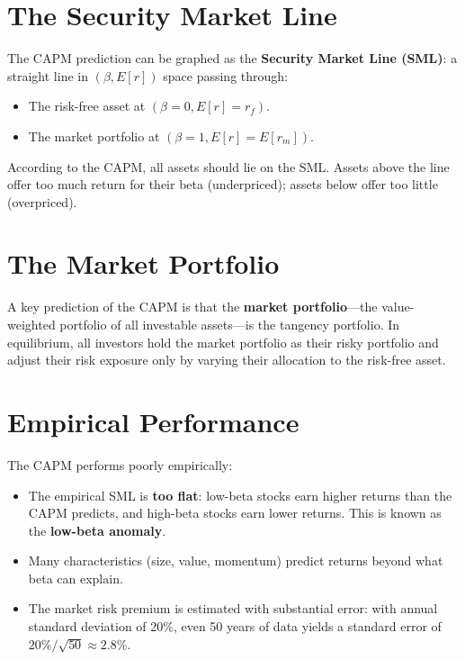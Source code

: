 \documentclass[11pt,letterpaper]{report}
\begin{document}
\section{The Security Market Line}


The CAPM prediction can be graphed as the \textbf{Security Market Line (SML)}: a straight line in $(\beta, E[r])$ space passing through:

\begin{itemize}
  \item The risk-free asset at $(\beta = 0, E[r] = r_f)$.
  \item The market portfolio at $(\beta = 1, E[r] = E[r_m])$.
\end{itemize}

According to the CAPM, all assets should lie on the SML.  Assets above the line offer too much return for their beta (underpriced); assets below offer too little (overpriced).

\section{The Market Portfolio}


A key prediction of the CAPM is that the \textbf{market portfolio}---the value-weighted portfolio of all investable assets---is the tangency portfolio.  In equilibrium, all investors hold the market portfolio as their risky portfolio and adjust their risk exposure only by varying their allocation to the risk-free asset.

\section{Empirical Performance}


The CAPM performs poorly empirically:

\begin{itemize}
  \item The empirical SML is \textbf{too flat}: low-beta stocks earn higher returns than the CAPM predicts, and high-beta stocks earn lower returns.  This is known as the \textbf{low-beta anomaly}.
  \item Many characteristics (size, value, momentum) predict returns beyond what beta can explain.
  \item The market risk premium is estimated with substantial error: with annual standard deviation of 20\%, even 50 years of data yields a standard error of $20\% / \sqrt{50} \approx 2.8\%$.
\end{itemize}
\end{document}
